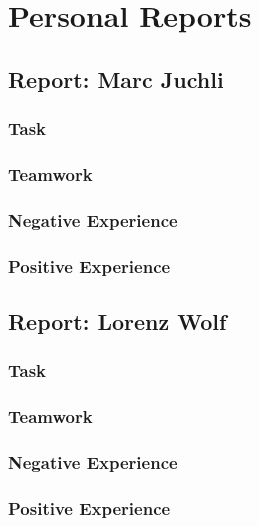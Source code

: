 \chapter{Personal Reports}

\section{Report: Marc Juchli}

\subsection{Task}
\subsection{Teamwork}
\subsection{Negative Experience}
\subsection{Positive Experience}


\section{Report: Lorenz Wolf}

\subsection{Task}
\subsection{Teamwork}
\subsection{Negative Experience}
\subsection{Positive Experience}


